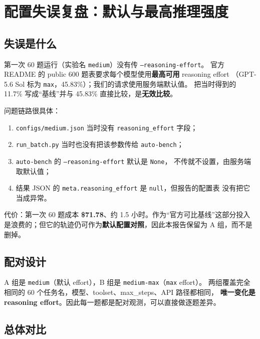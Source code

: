 \documentclass[UTF8,a4paper,11pt]{ctexart}
\begin{document}
\section{配置失误复盘：默认与最高推理强度}
\label{sec:config}

\subsection{失误是什么}

第一次 60 题运行（实验名 \texttt{medium}）没有传 \texttt{--reasoning-effort}。
官方 README 的 public 600 题表要求每个模型使用\textbf{最高可用} reasoning effort
（GPT-5.6 Sol 标为 \texttt{max}，45.83\%）；我们的请求使用服务端默认值。
把当时得到的 11.7\% 写成“基线”并与 45.83\% 直接比较，是\textbf{无效比较}。

问题链路很具体：

\begin{enumerate}
  \item \texttt{configs/medium.json} 当时没有 \texttt{reasoning\_effort} 字段；
  \item \texttt{run\_batch.py} 当时也没有把该参数传给 \texttt{auto-bench}；
  \item \texttt{auto-bench} 的 \texttt{--reasoning-effort} 默认是 \texttt{None}，
  不传就不设置，由服务端取默认值；
  \item 结果 JSON 的 \texttt{meta.reasoning\_effort} 是 \texttt{null}，但报告的配置表
  没有把它当成异常。
\end{enumerate}

代价：第一次 60 题成本 \textbf{\$71.78}、约 1.5 小时。作为“官方可比基线”这部分投入
是浪费的；但它的轨迹仍可作为\textbf{默认配置对照}，因此本报告保留为 A 组，而不是删掉。

\subsection{配对设计}

A 组是 \texttt{medium}（默认 effort），B 组是 \texttt{medium-max}（\texttt{max} effort）。
两组覆盖完全相同的 60 个任务名，模型、toolset、max\_steps、API 路径都相同，
\textbf{唯一变化是 reasoning effort}。因此每一题都是配对观测，可以直接做逐题差异。

\subsection{总体对比}
\end{document}
